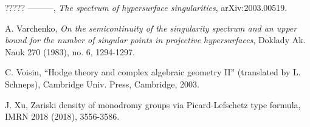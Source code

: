 \documentclass[12pt,letterpaper,english]{amsart}
\numberwithin{equation}{section}
\numberwithin{figure}{section}
\theoremstyle{plain}
\theoremstyle{remark}
\theoremstyle{definition}
\theoremstyle{definition}
\theoremstyle{plain}
\theoremstyle{plain}
\theoremstyle{plain}
\theoremstyle{plain}
\theoremstyle{definition}
\theoremstyle{definition}
\begin{document}
\begin{thebibliography}{?????}
 ---------, \emph{The spectrum of hypersurface singularities}, arXiv:2003.00519.

 A. Varchenko, \emph{On the semicontinuity of the singularity spectrum and an upper bound for the number of singular points in projective hypersurfaces}, Doklady Ak. Nauk 270 (1983), no. 6, 1294-1297.

 C. Voisin, ``Hodge theory and complex algebraic geometry II'' (translated by L. Schneps), Cambridge Univ. Press, Cambridge, 2003.

 J. Xu, Zariski density of monodromy groups via Picard-Lefschetz type formula, IMRN 2018 (2018), 3556-3586.

\end{thebibliography}
\end{document}

